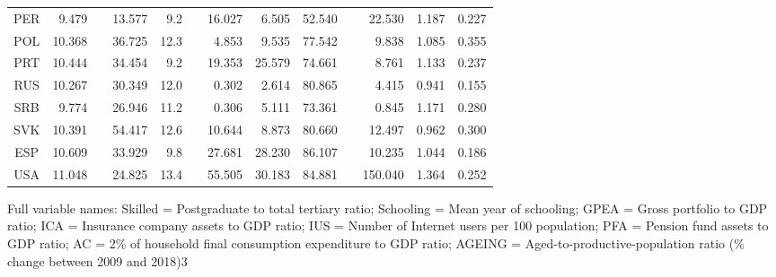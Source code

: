 {\begin{tabular}{cd{3} c d{3}d{1} c d{3}d{3}d{3} c d{3}d{3}d{3}}
    PER   & 9.479 &       & 13.577 & 9.2   &       & 16.027 & 6.505 & 52.540 &       & 22.530 & 1.187 & 0.227 \\
    POL   & 10.368 &       & 36.725 & 12.3  &       & 4.853 & 9.535 & 77.542 &       & 9.838 & 1.085 & 0.355 \\
    PRT   & 10.444 &       & 34.454 & 9.2   &       & 19.353 & 25.579 & 74.661 &       & 8.761 & 1.133 & 0.237 \\
    RUS   & 10.267 &       & 30.349 & 12.0  &       & 0.302 & 2.614 & 80.865 &       & 4.415 & 0.941 & 0.155 \\
    SRB   & 9.774 &       & 26.946 & 11.2  &       & 0.306 & 5.111 & 73.361 &       & 0.845 & 1.171 & 0.280 \\
    SVK   & 10.391 &       & 54.417 & 12.6  &       & 10.644 & 8.873 & 80.660 &       & 12.497 & 0.962 & 0.300 \\
    ESP   & 10.609 &       & 33.929 & 9.8   &       & 27.681 & 28.230 & 86.107 &       & 10.235 & 1.044 & 0.186 \\
    USA   & 11.048 &       & 24.825 & 13.4  &       & 55.505 & 30.183 & 84.881 &       & 150.040 & 1.364 & 0.252 \\
    \bottomrule
    \end{tabular}
}{Full variable names: Skilled = Postgraduate to total tertiary ratio; Schooling = Mean year of schooling; GPEA = Gross portfolio to GDP ratio; ICA = Insurance company assets to GDP ratio; IUS = Number of Internet users per 100 population; PFA = Pension fund assets to GDP ratio; AC = 2\% of household final consumption expenditure to GDP ratio; AGEING = Aged-to-productive-population ratio (\% change between 2009 and 2018)}{3}
